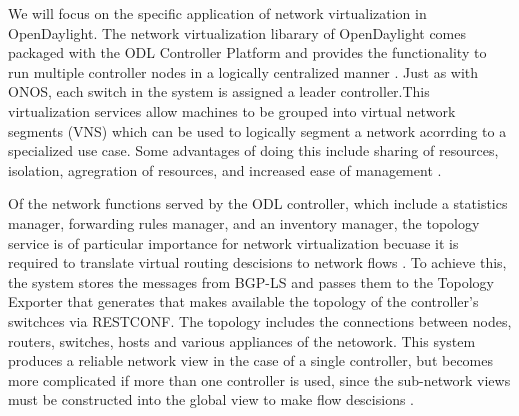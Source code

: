 \documentclass[letterpaper,twocolumn,10pt]{article}
\begin{document}
We will focus on the specific application of network virtualization in OpenDaylight. The network virtualization libarary of OpenDaylight comes packaged with the ODL Controller Platform and provides the functionality to run multiple controller nodes in a logically centralized manner \cite{ONV:wiki}. Just as with ONOS, each switch in the system is assigned a leader controller.This virtualization services allow machines to be grouped into virtual network segments (VNS) which can be used to logically segment a network acorrding to a specialized use case. Some advantages of doing this include sharing of resources, isolation, agregration of resources, and increased ease of management \cite{jain2013network}.

Of the network functions served by the ODL controller, which include a statistics manager, forwarding rules manager, and an inventory manager, the topology service is of particular importance for network virtualization becuase it is required to translate virtual routing descisions to network flows \cite{jain2013network}. To achieve this, the system stores the messages from BGP-LS and passes them to the Topology Exporter that generates that makes available the topology of the controller's switchces via RESTCONF. The topology includes the connections between nodes, routers, switches, hosts and various appliances of the netowork. This system produces a reliable network view in the case of a single controller, but becomes more complicated if more than one controller is used, since the sub-network views must be constructed into the global view to make flow descisions \cite{bgp:rfc}.

    



% 
% 
% 
% 


\end{document}
